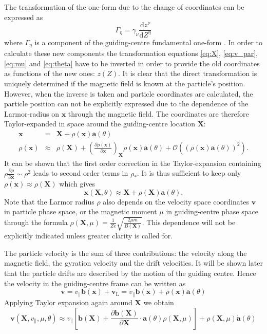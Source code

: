 \documentclass[a4paper,10pt]{article}
\newcommand{\st}[1]{\mathrm{#1}} %
\renewcommand{\vec}[1]{\mathbf{#1}}
\begin{document}
The transformation of the one-form due to the change of coordinates can be expressed as
\begin{equation}
	\Gamma_{\eta} = \gamma_{\nu} \frac{\mathrm{d} z^{\nu}}{\mathrm{d} Z^{\eta}}
	\label{eq:gc_transform}
\end{equation}
where $\Gamma_{\eta}$ is a component of the guiding-centre fundamental one-form \cite{scott_gotit}. In order to calculate these new components the transformation equations \ref{eq:X}, \ref{eq:v_par}, \ref{eq:mu} and \ref{eq:theta} have to be inverted in order to provide the old coordinates as functions of the new ones: $z(Z)$. It is clear that the direct transformation is uniquely determined if the magnetic field is known at the particle's position. However, when the inverse is taken and particle coordinates are calculated, the particle position can not be explicitly expressed due to the dependence of the Larmor-radius on $\vec{x}$ through the magnetic field. The coordinates are therefore Taylor-expanded in space around the guiding-centre location $\vec{X}$:
\begin{eqnarray*}
	\mathbf{x} &=& \mathbf{X} + \rho(\mathbf{x}) \mathbf{a}(\theta) \\
	\rho(\mathbf{x}) &\approx& \rho(\mathbf{X}) + \left( \frac{\partial \rho(\mathbf{x})}{\partial \mathbf{x}} \right)_{\mathbf{X}} \rho(\mathbf{x}) \mathbf{a}(\theta) + \mathcal{O}((\rho(\mathbf{x}) \mathbf{a}(\theta))^2).
\end{eqnarray*} 
It can be shown that the first order correction in the Taylor-expansion containing $\rho \frac{\partial \rho}{\partial \vec{x}} \sim \rho^2$ leads to second order terms in $\rho_*$. It is thus sufficient to keep only $\rho(\vec{x}) \approx \rho(\vec{X})$ which gives
\begin{equation}
	\vec{x}(\vec{X},\theta) \approx \vec{X} + \rho(\vec{X}) \vec{a}(\theta). \label{eq:x(X)}
\end{equation}
Note that the Larmor radius $\rho$ also depends on the velocity space coordinates $\vec{v}$ in particle phase space, or the magnetic moment $\mu$ in guiding-centre phase space through the formula $\rho(\vec{X},\mu) = \frac{1}{Z e} \sqrt{\frac{2 \mu m}{B(\vec{X})}}$. This dependence will not be explicitly indicated unless greater clarity is called for. 

The particle velocity is the sum of three contributions: the velocity along the magnetic field, the gyration velocity and the drift velocities. It will be shown later that the particle drifts are described by the motion of the guiding centre. Hence the velocity in the guiding-centre frame can be written as
\[\vec{v} = v_{\parallel} \mathbf{b}(\mathbf{x}) + \mathbf{v}_{\st{L}} = v_{\parallel} \mathbf{b}(\mathbf{x}) + \rho(\mathbf{x}) \dot{\mathbf{a}}(\theta)\] 
Applying Taylor expansion again around $\vec{X}$ we obtain
\begin{equation}
	\vec{v}(\vec{X},v_{\parallel},\mu,\theta) \approx v_{\parallel} \left[ \mathbf{b}(\mathbf{X}) + \frac{\partial \mathbf{b}(\mathbf{X})}{\partial \mathbf{X}} \cdot \mathbf{a}(\theta) \rho(\mathbf{X}, \mu) \right] + \rho(\mathbf{X}, \mu) \dot{\mathbf{a}}(\theta)
	\label{eq:v(X)}
\end{equation}
\end{document}
